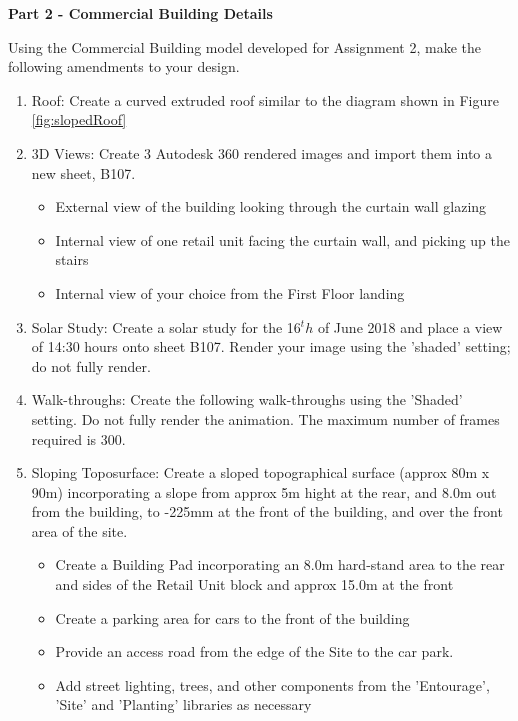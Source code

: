 \newpage
\begin{flushleft}
	\large\textbf{Part 2 - Commercial Building Details}\\
\end{flushleft}

Using the Commercial Building model developed for Assignment 2, make the following amendments to your design. 

\begin{enumerate}
	\item Roof: Create a curved extruded roof similar to the diagram shown in Figure \ref{fig:slopedRoof}
	
	\item 3D Views: Create 3 Autodesk 360 rendered images and import them into a new sheet, B107.
	\begin{itemize}
		\item External view of the building looking through the curtain wall glazing
		\item Internal view of one retail unit facing the curtain wall, and picking up the stairs
		\item Internal view of your choice from the First Floor landing 
	\end{itemize} 
	\item Solar Study: Create a solar study for the 16$^th$ of June 2018 and place a view of 14:30 hours onto sheet B107.  Render your image using the 'shaded' setting; do not fully render.  
	\item Walk-throughs: Create the following walk-throughs using the 'Shaded' setting.  Do not fully render the animation.  The maximum number of frames required is 300.
	\item Sloping Toposurface: Create a sloped topographical surface (approx 80m x 90m) incorporating a slope from approx 5m hight at the rear, and 8.0m out from the building, to -225mm at the front of the building, and over the front area of the site.
	\begin{itemize}
		\item Create a Building Pad incorporating an 8.0m hard-stand area to the rear and sides of the Retail Unit block and approx 15.0m at the front
		\item Create a parking area for cars to the front of the building
		\item Provide an access road from the edge of the Site to the car park.
		\item Add street lighting, trees, and other components from the 'Entourage', 'Site' and 'Planting' libraries as necessary 
	\end{itemize}
	
\end{enumerate}


